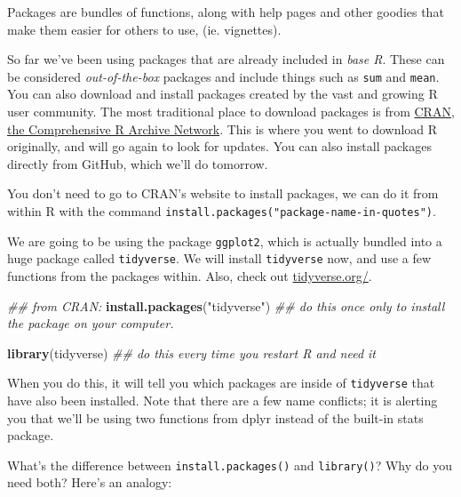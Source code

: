 \documentclass[]{book}
\newenvironment{Shaded}{\begin{snugshade}}{\end{snugshade}}
\newcommand{\CommentTok}[1]{\textcolor[rgb]{0.56,0.35,0.01}{\textit{#1}}}
\newcommand{\KeywordTok}[1]{\textcolor[rgb]{0.13,0.29,0.53}{\textbf{#1}}}
\newcommand{\NormalTok}[1]{#1}
\newcommand{\StringTok}[1]{\textcolor[rgb]{0.31,0.60,0.02}{#1}}
\begin{document}
Packages are bundles of functions, along with help pages and other goodies that make them easier for others to use, (ie. vignettes).

So far we've been using packages that are already included in \emph{base R}. These can be considered \emph{out-of-the-box} packages and include things such as \texttt{sum} and \texttt{mean}. You can also download and install packages created by the vast and growing R user community. The most traditional place to download packages is from \href{https://cran.r-project.org/}{CRAN, the Comprehensive R Archive Network}. This is where you went to download R originally, and will go again to look for updates. You can also install packages directly from GitHub, which we'll do tomorrow.

You don't need to go to CRAN's website to install packages, we can do it from within R with the command \texttt{install.packages("package-name-in-quotes")}.

We are going to be using the package \texttt{ggplot2}, which is actually bundled into a huge package called \texttt{tidyverse}. We will install \texttt{tidyverse} now, and use a few functions from the packages within. Also, check out \href{https://www.tidyverse.org}{tidyverse.org/}.

\begin{Shaded}
\begin{Highlighting}[]
\CommentTok{## from CRAN:}
\KeywordTok{install.packages}\NormalTok{(}\StringTok{"tidyverse"}\NormalTok{) }\CommentTok{## do this once only to install the package on your computer.}
\end{Highlighting}
\end{Shaded}

\begin{Shaded}
\begin{Highlighting}[]
\KeywordTok{library}\NormalTok{(tidyverse) }\CommentTok{## do this every time you restart R and need it }
\end{Highlighting}
\end{Shaded}

When you do this, it will tell you which packages are inside of \texttt{tidyverse} that have also been installed. Note that there are a few name conflicts; it is alerting you that we'll be using two functions from dplyr instead of the built-in stats package.

What's the difference between \texttt{install.packages()} and \texttt{library()}? Why do you need both? Here's an analogy:
\end{document}
